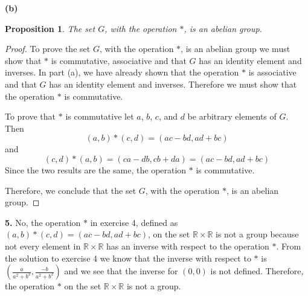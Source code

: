 \documentclass[12pt]{article}   %
\newtheorem*{proposition}{Proposition}  %
\begin{document}
\bigskip
\noindent\textbf{(b)}
\begin{proposition}
The set $G$, with the operation $\ast$, is an abelian group.
\end{proposition}
\begin{proof}
To prove the set $G$, with the operation $\ast$, is an abelian group we must show that $\ast$ is commutative, associative and that $G$ has an identity element and inverses. In part (a), we have already shown that the operation $*$ is associative and that $G$ has an identity element and inverses. Therefore we must show that the operation $*$ is commutative.

To prove that $*$ is commutative let $a$, $b$, $c$, and $d$ be arbitrary elements of $G$. Then
\begin{equation*}
(a,b)*(c,d) = (ac - bd, ad + bc)
\end{equation*}
and
\begin{equation*}
(c,d)*(a,b) = (ca - db, cb + da) = (ac - bd, ad + bc)
\end{equation*}
Since the two results are the same, the operation $\ast$ is commutative.

Therefore, we conclude that the set $G$, with the operation $\ast$, is an abelian group.
\end{proof}

\noindent\textbf{5.} \quad No, the operation $*$ in exercise 4, defined as $(a,b)*(c,d) = (ac - bd, ad + bc)$, on the set $\mathbb{R} \times \mathbb{R}$ is not a group because not every element in $\mathbb{R} \times \mathbb{R}$ has an inverse with respect to the operation $*$. From the solution to exercise 4 we know that the inverse with respect to $*$ is $(\tfrac{a}{a^2 + b^2}, \tfrac{-b}{a^2 + b^2})$ and we see that the inverse for $(0,0)$ is not defined. Therefore, the operation $*$ on the set $\mathbb{R} \times \mathbb{R}$ is not a group.
\end{document}

